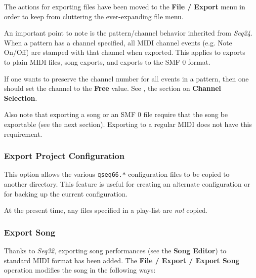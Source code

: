    The actions for exporting files have been moved to the
   \textbf{File / Export} menu in order to keep from cluttering the
   ever-expanding file menu.

   An important point to note is the pattern/channel behavior inherited
   from \textsl{Seq24}.
   When a pattern has a channel specified, all MIDI channel events
   (e.g. Note On/Off) are stamped with that channel when exported.
   This applies to exports to plain MIDI files, song exports, and
   exports to the SMF 0 format.

   If one wants to preserve the channel number for all events in
   a pattern, then one should set the channel to the \textbf{Free}
   value.  See , the section on
   \textbf{Channel Selection}.

   Also note that exporting a song or an SMF 0 file require that the song
   be exportable (see the next section).
   Exporting to a regular MIDI does not have this requirement.

\subsubsection{Export Project Configuration}
\label{subsubsec:midi_export_configuration_export}

   This option allows the various \texttt{qseq66.*} configuration
   files to be copied to another directory.
   This feature is useful for creating an alternate configuration or
   for backing up the current configuration.

   At the present time, any files specified in a play-list are
   \textsl{not} copied.

\subsubsection{Export Song}
\label{subsubsec:midi_export_song_export}

   Thanks to \textsl{Seq32}, exporting song performances (see the
   \textbf{Song Editor}) to standard MIDI format has been added.
   The \textbf{File / Export / Export Song} operation modifies the song in the
   following ways:

